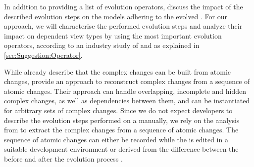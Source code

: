 In addition to providing a list of \metamodel evolution operators, \textcite{herrmannsdoerfer_extensive_2011} discuss the impact of the described evolution steps on the models adhering to the evolved \metamodels.
For our approach, we will characterise the performed evolution steps and analyze their impact on dependent view types by using the most important evolution operators, according to an industry study of \textcite{khelladi_detecting_2015} and as explained in \cref{sec:Suggestion:Operator}.


While \textcite{herrmannsdoerfer_extensive_2011} already describe that the complex changes can be built from atomic changes, \textcite{khelladi_change_2018} provide an approach to reconstruct complex changes from a sequence of atomic changes.
Their approach can handle overlapping, incomplete and hidden complex changes, as well as dependencies between them, and can be instantiated for arbitrary sets of complex changes.
Since we do not expect developers to describe the evolution steps performed on a \metamodel manually, we rely on the analysis from \textcite{khelladi_change_2018} to extract the complex changes from a sequence of atomic changes.
The sequence of atomic changes can either be recorded while the \metamodel is edited in a suitable development environment or derived from the difference between the \metamodel before and after the evolution process \cite{wittler_differencing_2023}.
